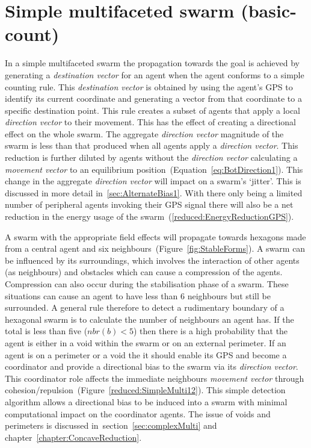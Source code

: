 \section{Simple multifaceted swarm (basic-count)} 
In a simple multifaceted swarm the propagation towards the goal is achieved by generating a \textit{destination vector} for an agent when the agent conforms to a simple counting rule. This \textit{destination vector} is obtained by using the agent's GPS to identify its current coordinate and generating a vector from that coordinate to a specific destination point. This rule creates a subset of agents that apply a local \textit{direction vector} to their movement. This has the effect of creating a directional effect on the whole swarm. The aggregate \textit{direction vector} magnitude of the swarm is less than that produced when all agents apply a \textit{direction vector}. This reduction is further diluted by agents without the \textit{direction vector} calculating a \textit{movement vector} to an equilibrium position~(Equation~\ref{eq:BotDirection1}). This change in the aggregate \textit{direction vector} will impact on a swarm's `jitter'. This is discussed in more detail in~\autoref{sec:AlternateBias1}. With there only being a limited number of peripheral agents invoking their GPS signal there will also be a net reduction in the energy usage of the swarm~(\autoref{reduced:EnergyReductionGPS}).

A swarm with the appropriate field effects will propagate towards hexagons made from a central agent and six neighbours~(Figure~\ref{fig:StableForms}). A swarm can be influenced by its surroundings, which involves the interaction of other agents (as neighbours) and obstacles which can cause a compression of the agents. Compression can also occur during the stabilisation phase of a swarm. These situations can cause an agent to have less than 6 neighbours but still be surrounded. A general rule therefore to detect a rudimentary boundary of a hexagonal swarm is to calculate the number of neighbours an agent has. If the total is less than five ($nbr(b) < 5$) then there is a high probability that the agent is either in a void within the swarm or on an external perimeter. If an agent is on a perimeter or a void the it should enable its GPS and become a coordinator and provide a directional bias to the swarm via its \textit{direction vector}. This coordinator role affects the immediate neighbours \textit{movement vector} through cohesion/repulsion~(Figure~\ref{reduced:SimpleMulti12}). This simple detection algorithm allows a directional bias to be induced into a swarm with minimal computational impact on the coordinator agents. The issue of voids and perimeters is discussed in~section~\ref{sec:complexMulti} and chapter~\ref{chapter:ConcaveReduction}.

